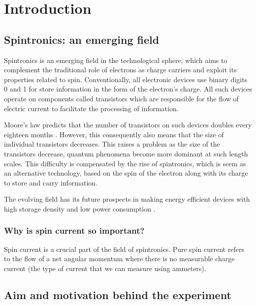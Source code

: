 \chapter{Introduction}

\label{chapter1}

\section{Spintronics: an emerging field}

Spintronics is an emerging field in the technological sphere, which aims to complement the traditional role of electrons as charge carriers and exploit its properties related to spin.
Conventionally, all electronic devices use binary digits 0 and 1 for store information in the form of the electron's charge.
All such devices operate on components called transistors which are responsible for the flow of electric current to facilitate the processing of information.

Moore's law predicts that the number of transistors on such devices doubles every eighteen months \cite{moore1998cramming}.
However, this consequently also means that the size of individual transistors decreases.
This raises a problem as the size of the transistors decrease, quantum phenomena become more dominant at such length scales.
This difficulty is compensated by the rise of spintronics, which is seem as an alternative technology, based on the spin of the electron along with its charge to store and carry information.

The evolving field has its future prospects in making energy efficient devices with high storage density and low power consumption \cite{Yakout_2020}.

\subsection{Why is spin current so important?}

Spin current is a crucial part of the field of spintronics.
Pure spin current refers to the flow of a net angular momentum where there is no measurable charge current (the type of current that we can measure using ammeters).

\section{Aim and motivation behind the experiment}

